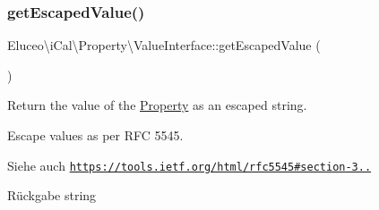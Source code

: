 \subsubsection{\texorpdfstring{get\+Escaped\+Value()}{getEscapedValue()}\hspace{0.1cm}{\footnotesize\ttfamily [2/3]}}
{\footnotesize\ttfamily Eluceo\textbackslash{}i\+Cal\textbackslash{}\+Property\textbackslash{}\+Value\+Interface\+::get\+Escaped\+Value (\begin{DoxyParamCaption}{ }\end{DoxyParamCaption})}

Return the value of the \mbox{\hyperlink{class_eluceo_1_1i_cal_1_1_property}{Property}} as an escaped string.

Escape values as per R\+FC 5545.

\begin{DoxySeeAlso}{Siehe auch}
\href{https://tools.ietf.org/html/rfc5545#section-3.3.11}{\tt https\+://tools.\+ietf.\+org/html/rfc5545\#section-\/3..}
\end{DoxySeeAlso}
\begin{DoxyReturn}{Rückgabe}
string 
\end{DoxyReturn}



